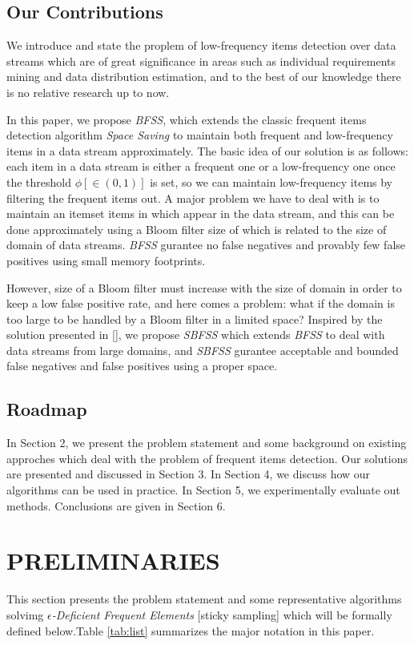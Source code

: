 \documentclass[conference]{IEEEtran}
\begin{document}
\subsection{Our Contributions}
We introduce and state the proplem of low-frequency items detection over data streams which are of great significance in areas such as individual requirements mining and data distribution estimation, and to the best of our knowledge there is no relative research up to now.\par

In this paper, we propose \emph{BFSS}, which extends the classic frequent items detection algorithm \emph{Space Saving} to maintain both frequent and low-frequency items in a data stream approximately. The basic idea of our solution is as follows: each item in a data stream is either a frequent one or a low-frequency one once the threshold $\phi[\in (0,1)]$ is set, so we can maintain low-frequency items by filtering the frequent items out. A major problem we have to deal with is to maintain an itemset items in which appear in the data stream, and this can be done approximately using a Bloom filter size of which is related to the size of domain of data streams. \emph{BFSS} gurantee no false negatives and provably few false positives using small memory footprints.\par

However, size of a Bloom filter must increase with the size of domain in order to keep a low false positive rate, and here comes a problem: what if the domain is too large to be handled by a Bloom filter in a limited space? Inspired by the solution presented in [], we propose \emph{SBFSS} which extends \emph{BFSS} to deal with data streams from large domains, and \emph{SBFSS} gurantee acceptable and bounded false negatives and false positives using a proper space.

\subsection{Roadmap}
In Section 2, we present the problem statement and some background on existing approches which deal with the problem of frequent items detection. Our solutions are presented and discussed in Section 3. In Section 4, we discuss how our algorithms can be used in practice. In Section 5, we experimentally evaluate out methods. Conclusions are given in Section 6.

\section{PRELIMINARIES}
This section presents the problem statement and some representative algorithms solvimg $\epsilon$\emph{-Deficient Frequent Elements} [sticky sampling] which will be formally defined below.Table \ref{tab:list} summarizes the major notation in this paper.
\end{document}
